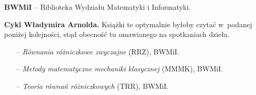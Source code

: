 \documentclass[a4paper,11pt]{article}
\begin{document}
\vspace{1em}



\noindent
\textbf{BWMiI} -- Biblioteka Wydziału Matematyki i Informatyki. \\

\vspace{0.5em}



\noindent
\textbf{Cykl Władymira Arnolda.} Książki te optymalnie byłoby czytać
w~podanej poniżej kolejności, stąd obecność tu omawianego na
spotkaniach dzieła.

\begin{itemize}
\item[--] \textit{Równania różniczkowe zwyczajne} (RRZ), BWMiI.

\item[--] \textit{Metody matematyczne mechaniki klasycznej} (MMMK),
  BWMiI. %

\item[--] \textit{Teoria równań różniczkowych} (TRR), BWMiI.

\end{itemize}
\end{document}
